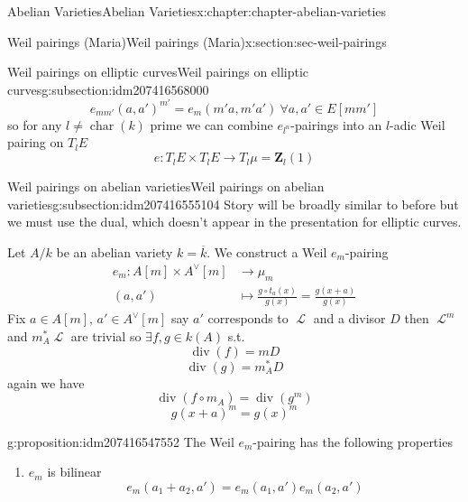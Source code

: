 \documentclass[oneside,10pt,]{book}
\numberwithin{equation}{section}
\newcommand{\sheaf}[1]{\operatorname{\mathcal{#1}}}
\newcommand{\lb}{[}
\newcommand{\rb}{]}
\newcommand{\ZZ}{\mathbf{Z}}
\DeclareMathOperator{\divisor}{div}
\DeclareMathOperator{\characteristic}{char}
\newcommand{\amp}{&}
\begin{document}
\begin{chapterptx}{Abelian Varieties}{}{Abelian Varieties}{}{}{x:chapter:chapter-abelian-varieties}
\begin{sectionptx}{Weil pairings (Maria)}{}{Weil pairings (Maria)}{}{}{x:section:sec-weil-pairings}
\begin{subsectionptx}{Weil pairings on elliptic curves}{}{Weil pairings on elliptic curves}{}{}{g:subsection:idm207416568000}
\begin{equation*}
e_{mm'} (a,a')^{m'} = e_m(m'a, m'a') \ \forall a,a' \in E[mm']
\end{equation*}
so for any \(l\ne \characteristic(k)\) prime we can combine \(e_{l^n}\)-pairings into an \(l\)-adic Weil pairing on \(T_l E\)%
\begin{equation*}
e \colon T_l E\times T_lE \to T_l \mu = \ZZ_l(1)
\end{equation*}
%
\end{subsectionptx}
%
%
\typeout{************************************************}
\typeout{************************************************}
%
\begin{subsectionptx}{Weil pairings on abelian varieties}{}{Weil pairings on abelian varieties}{}{}{g:subsection:idm207416555104}
Story will be broadly similar to before but we must use the dual, which doesn't appear in the presentation for elliptic curves.%
\par
Let \(A/k\) be an abelian variety \(k = \overline k\). We construct a Weil \(e_m\)-pairing%
\begin{align*}
e_m \colon A[m]\times A^\vee [m] \amp\to \mu_m\\
(a,a') \amp\mapsto \frac{g\circ t_a(x)}{g(x)} = \frac{g(x+a)}{g(x)}
\end{align*}
Fix \(a\in A\lb m\rb,\,a'\in A^\vee\lb m\rb\) say \(a'\) corresponds to \(\sheaf L\) and a divisor \(D\) then \(\sheaf L^m \) and \(m_A^* \sheaf L\) are trivial so \(\exists f,g \in k(A)\) s.t.%
\begin{equation*}
\divisor (f) = m D
\end{equation*}
%
\begin{equation*}
\divisor (g) = m_A^* D
\end{equation*}
again we have%
\begin{equation*}
\divisor( f\circ m_A) = \divisor (g^m)
\end{equation*}
%
\begin{equation*}
g(x+a)^m = g(x)^m
\end{equation*}
%
\begin{proposition}{}{}{g:proposition:idm207416547552}%
The Weil \(e_m\)-pairing has the following properties%
\begin{enumerate}
\item{}\(e_m\) is bilinear%
\begin{equation*}
e_m(a_1+a_2,a') = e_m(a_1,a')e_m(a_2, a')
\end{equation*}

\end{enumerate}
\end{proposition}
\end{subsectionptx}
\end{sectionptx}
\end{chapterptx}
\end{document}
